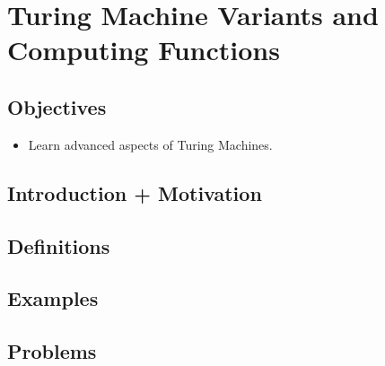 \chapter{Turing Machine Variants and Computing Functions}

\section{Objectives}

\begin{itemize}
	\item Learn advanced aspects of Turing Machines.
\end{itemize}

\section{Introduction + Motivation}

\section{Definitions}

\section{Examples}

\section{Problems}